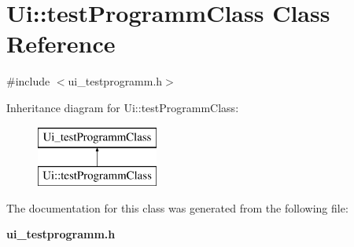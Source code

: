 \section{Ui::testProgrammClass Class Reference}
\label{class_ui_1_1test_programm_class}


{\ttfamily \#include $<$ui\_\-testprogramm.h$>$}

Inheritance diagram for Ui::testProgrammClass:\begin{figure}[H]
\begin{center}
\leavevmode
\includegraphics[height=2.000000cm]{class_ui_1_1test_programm_class}
\end{center}
\end{figure}


The documentation for this class was generated from the following file:\begin{DoxyCompactItemize}
\item 
{\bf ui\_\-testprogramm.h}\end{DoxyCompactItemize}
